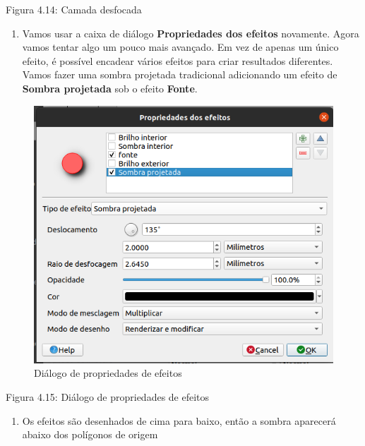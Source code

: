 \documentclass[
]{book}
\providecommand{\tightlist}{%
  \setlength{\itemsep}{0pt}\setlength{\parskip}{0pt}}
\begin{document}
Figura 4.14: Camada desfocada

\begin{enumerate}
\def\labelenumi{\arabic{enumi}.}
\setcounter{enumi}{5}
\tightlist
\item
  Vamos usar a caixa de diálogo \textbf{Propriedades dos efeitos} novamente. Agora vamos tentar algo um pouco mais avançado. Em vez de apenas um único efeito, é possível encadear vários efeitos para criar resultados diferentes. Vamos fazer uma sombra projetada tradicional adicionando um efeito de \textbf{Sombra projetada} sob o efeito \textbf{Fonte}.
\end{enumerate}

\begin{figure}
\centering
\includegraphics{media/modulo4/drop-shadow.png}
\caption{Diálogo de propriedades de efeitos}
\end{figure}

Figura 4.15: Diálogo de propriedades de efeitos

\begin{enumerate}
\def\labelenumi{\arabic{enumi}.}
\setcounter{enumi}{6}
\tightlist
\item
  Os efeitos são desenhados de cima para baixo, então a sombra aparecerá abaixo dos polígonos de origem
\end{enumerate}
\end{document}
